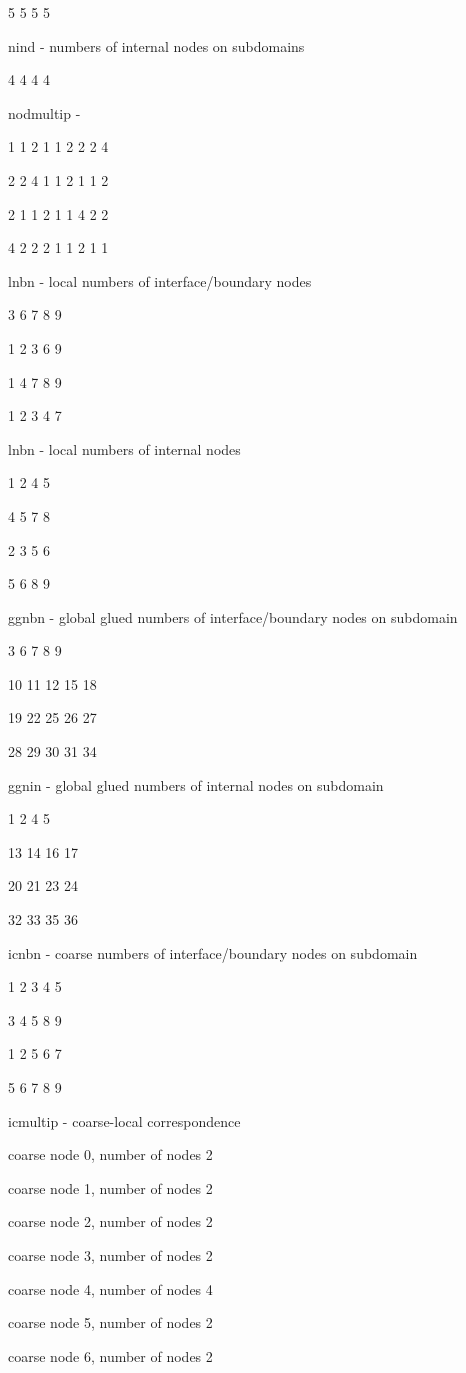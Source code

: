 5 5 5 5

nind - numbers of internal nodes on subdomains

4 4 4 4

nodmultip - 

 1 1 2 1 1 2 2 2 4

 2 2 4 1 1 2 1 1 2

 2 1 1 2 1 1 4 2 2

 4 2 2 2 1 1 2 1 1


lnbn - local numbers of interface/boundary nodes

 3 6 7 8 9

 1 2 3 6 9

 1 4 7 8 9

 1 2 3 4 7

lnbn - local numbers of internal nodes

 1 2 4 5

 4 5 7 8

 2 3 5 6

 5 6 8 9


ggnbn - global glued numbers of interface/boundary nodes on subdomain


 3 6 7 8 9

10 11 12 15 18

19 22 25 26 27

28 29 30 31 34


ggnin - global glued numbers of internal nodes on subdomain

 1 2 4 5

13 14 16 17

20 21 23 24 

32 33 35 36

icnbn - coarse numbers of interface/boundary nodes on subdomain


 1 2 3 4 5

 3 4 5 8 9

 1 2 5 6 7

 5 6 7 8 9

icmultip - coarse-local correspondence 

 coarse node      0, number of nodes  2

 coarse node      1, number of nodes  2

 coarse node      2, number of nodes  2

 coarse node      3, number of nodes  2

 coarse node      4, number of nodes  4

 coarse node      5, number of nodes  2

 coarse node      6, number of nodes  2

